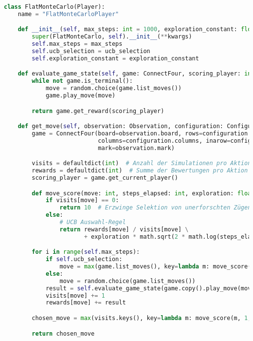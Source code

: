\begin{lstlisting}[language=Python,caption=Flache Monte Carlo Suche.,label={lst:flat-mc}]
class FlatMonteCarlo(Player):
    name = "FlatMonteCarloPlayer"

    def __init__(self, max_steps: int = 1000, exploration_constant: float = 1.0, ucb_selection: bool = True, **kwargs):
        super(FlatMonteCarlo, self).__init__(**kwargs)
        self.max_steps = max_steps
        self.ucb_selection = ucb_selection
        self.exploration_constant = exploration_constant

    def evaluate_game_state(self, game: ConnectFour, scoring_player: int) -> int:
        while not game.is_terminal():
            move = random.choice(game.list_moves())
            game.play_move(move)

        return game.get_reward(scoring_player)

    def get_move(self, observation: Observation, configuration: Configuration) -> int:
        game = ConnectFour(board=observation.board, rows=configuration.rows,
                           columns=configuration.columns, inarow=configuration.inarow,
                           mark=observation.mark)

        visits = defaultdict(int)  # Anzahl der Simulationen pro Aktion
        rewards = defaultdict(int)  # Summe der Bewertungen pro Aktion
        scoring_player = game.get_current_player()

        def move_score(move: int, steps_elapsed: int, exploration: float) -> float:
            if visits[move] == 0:
                return 10  # Erzwinge Selektion von unerforschten Zügen
            else:
                # UCB Auswahl-Regel
                return rewards[move] / visits[move] \
                       + exploration * math.sqrt(2 * math.log(steps_elapsed) / visits[move])

        for i in range(self.max_steps):
            if self.ucb_selection:
                move = max(game.list_moves(), key=lambda m: move_score(m, i + 1, self.exploration_constant))
            else:
                move = random.choice(game.list_moves())
            result = self.evaluate_game_state(game.copy().play_move(move), scoring_player)
            visits[move] += 1
            rewards[move] += result

        chosen_move = max(visits.keys(), key=lambda m: move_score(m, 1, 0))

        return chosen_move
\end{lstlisting}

